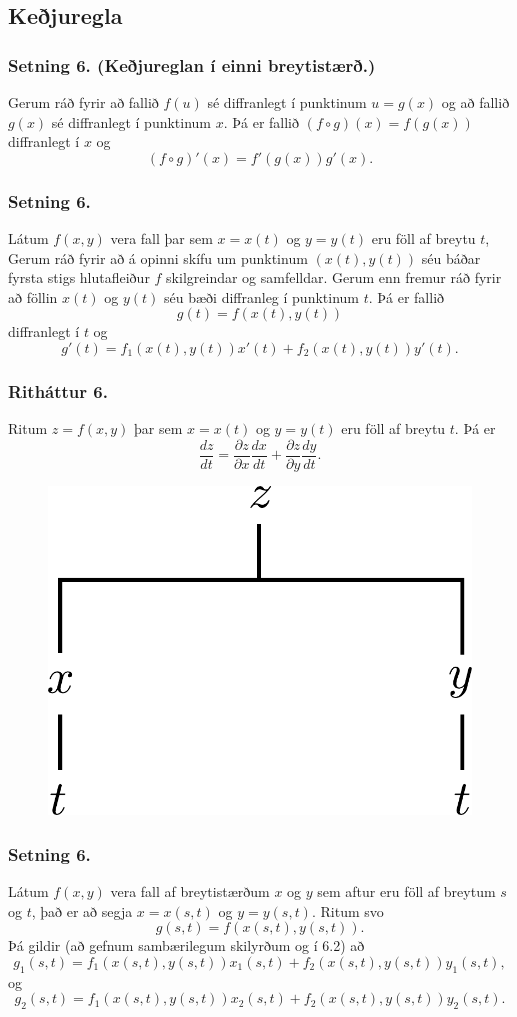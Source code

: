  


\subsection{Keðjuregla} 

\subsubsection{Setning 6. (Keðjureglan í einni breytistærð.)}
 Gerum ráð fyrir að fallið $f(u)$ sé diffranlegt í punktinum $u=g(x)$ og að fallið $g(x)$ sé diffranlegt í punktinum $x$.  Þá er fallið $(f\circ g)(x)=f(g(x))$ diffranlegt í $x$ og 
$$(f\circ g)'(x)=f'(g(x))g'(x).$$


\subsubsection{Setning 6.}
Látum $f(x,y)$ vera fall þar sem $x=x(t)$ og $y=y(t)$ eru föll af breytu $t$,  Gerum ráð fyrir að á opinni skífu um  punktinum $(x(t),y(t))$ séu báðar fyrsta stigs hlutafleiður $f$ skilgreindar og samfelldar.   Gerum enn fremur ráð fyrir að föllin $x(t)$ og $y(t)$ séu bæði diffranleg í punktinum $t$.  Þá er fallið 
$$g(t)=f(x(t),y(t))$$
diffranlegt í $t$ og 
$$g'(t)=f_1(x(t),y(t))x'(t)+f_2(x(t),y(t))y'(t).$$



\subsubsection{Ritháttur 6.}

Ritum $z=f(x,y)$ þar sem $x=x(t)$ og $y=y(t)$ eru föll af breytu $t$.  Þá er 
$$\frac{dz}{dt}=\frac{\partial z}{\partial x}\frac{dx}{dt}
+\frac{\partial z}{\partial y}\frac{dy}{dt}.$$

 \begin{figure}[h!]
           \centering
            \includegraphics[width=0.3\linewidth]{chain1}
    \end{figure}


\subsubsection{Setning 6.}
 Látum $f(x,y)$ vera fall af breytistærðum $x$ og $y$ sem aftur eru föll af breytum $s$ og $t$, það er að segja 
$x=x(s,t)$ og $y=y(s,t)$.  Ritum svo 
$$g(s,t)=f(x(s,t),y(s,t)).$$
Þá gildir (að gefnum sambærilegum skilyrðum og í 6.2) að
$$g_1(s,t)=f_1(x(s,t),y(s,t))x_1(s,t)+f_2(x(s,t),y(s,t))y_1(s,t),$$
og 
$$g_2(s,t)=f_1(x(s,t),y(s,t))x_2(s,t)+f_2(x(s,t),y(s,t))y_2(s,t).$$



